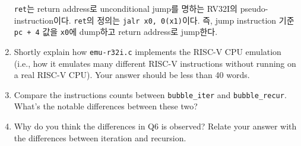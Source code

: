 \documentclass[
    a4paper,
    oneside,
    adjustmath,
    finemath,
    itemph,
    nonfrench,
    11pt
]{oblivoir}
\begin{document}
\begin{enumerate}
        \verb|ret|는 return address로 unconditional jump를 명하는 RV32I의 pseudo-instruction이다.
        \verb|ret|의 정의는 \verb|jalr x0, 0(x1)|이다.
        즉, jump instruction 기준 \verb|pc + 4| 값을 \verb|x0|에 dump하고 return address로 jump한다.
        \item Shortly explain how \verb|emu-r32i.c| implements the RISC-V CPU emulation (i.e., how it emulates many different RISC-V instructions without running on a real RISC-V CPU). Your answer should be less than 40 words.
        \item Compare the instructions counts between \verb|bubble_iter| and \verb|bubble_recur|. What's the notable differences between these two?
        \item Why do you think the differences in Q6 is observed? Relate your answer with the differences between iteration and recursion.
    \end{enumerate}
\end{document}
